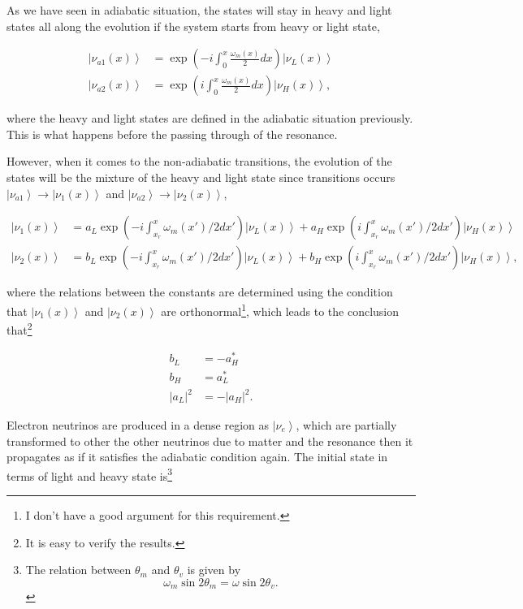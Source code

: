 \documentclass{tufte-handout}
\newcommand{\ket}[1]{\left| #1\right\rangle}
\begin{document}
As we have seen in adiabatic situation, the states will stay in heavy and light states all along the evolution if the system starts from heavy or light state,

\begin{align*}
\ket{\nu_{a1}(x)} &= \exp(-i \int_0^x \frac{\omega_m(x)}{2} dx )  \ket{\nu_L(x)} \\
\ket{\nu_{a2}(x)} &= \exp(i\int_0^x \frac{\omega_m(x)}{2} dx) \ket{\nu_H(x)},
\end{align*}

where the heavy and light states are defined in the adiabatic situation previously. {\color{blue}This is what happens before the passing through of the resonance.}


However, when it comes to the non-adiabatic transitions, the evolution of the states will be the mixture of the heavy and light state since transitions occurs $\ket{\nu_{a1}}\to \ket{\nu_1(x)}$ and $\ket{\nu_{a2}}\to\ket{\nu_2(x)}$,

\begin{align*}
\ket{\nu_1(x)} &= a_L \exp(-i \int_{x_r}^x \omega_m(x')/2 dx' )  \ket{\nu_L(x)} + a_H \exp(i\int_{x_r}^x \omega_m(x')/2 dx') \ket{\nu_H(x)}  \\
\ket{\nu_2(x)} &= b_L \exp(-i \int_{x_r}^x \omega_m(x')/2 dx' )  \ket{\nu_L(x)} + b_H \exp(i\int_{x_r}^x \omega_m(x')/2 dx') \ket{\nu_H(x)},
\end{align*}


where the relations between the constants are determined using the condition that $\ket{\nu_1(x)}$ and $\ket{\nu_2(x)}$ are orthonormal\footnote{\color{red}I don't have a good argument for this requirement.}, which leads to the conclusion that\footnote{It is easy to verify the results.}

\begin{align*}
b_L &= -a_H^* \\
b_H &= a_L^* \\
\lvert a_L \rvert^2 &=  - \lvert a_H \rvert^2 .
\end{align*}


Electron neutrinos are produced in a dense region as $\ket{\nu_e}$, which are partially transformed to other the other neutrinos due to matter and the resonance then it propagates as if it satisfies the adiabatic condition again. The initial state in terms of light and heavy state is\footnote{The relation between $\theta_m$ and $\theta_v$ is given by \begin{equation*}
\omega_m\sin 2\theta_m =  \omega \sin 2\theta_v .
\end{equation*}}
\end{document}
